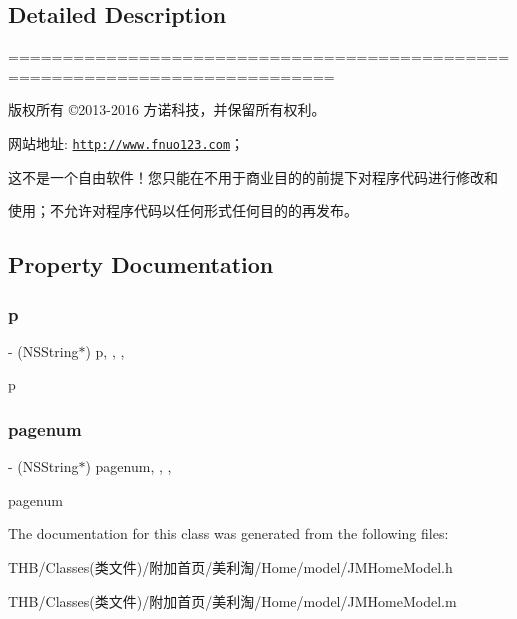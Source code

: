 \subsection{Detailed Description}
============================================================================

版权所有 ©2013-\/2016 方诺科技，并保留所有权利。

网站地址\+: \href{http://www.fnuo123.com}{\tt http\+://www.\+fnuo123.\+com}； 



这不是一个自由软件！您只能在不用于商业目的的前提下对程序代码进行修改和

使用；不允许对程序代码以任何形式任何目的的再发布。 

 

\subsection{Property Documentation}
\mbox{\label{interface_j_m_home_model_aaae2bcc132f99e39ab5ba76fc3125968}} 
\subsubsection{\texorpdfstring{p}{p}}
{\footnotesize\ttfamily -\/ (N\+S\+String$\ast$) p\hspace{0.3cm}{\ttfamily [read]}, {\ttfamily [write]}, {\ttfamily [nonatomic]}, {\ttfamily [copy]}}

p \mbox{\label{interface_j_m_home_model_a04a1d641585dea8183d3591b5eec7765}} 
\subsubsection{\texorpdfstring{pagenum}{pagenum}}
{\footnotesize\ttfamily -\/ (N\+S\+String$\ast$) pagenum\hspace{0.3cm}{\ttfamily [read]}, {\ttfamily [write]}, {\ttfamily [nonatomic]}, {\ttfamily [copy]}}

pagenum 

The documentation for this class was generated from the following files\+:\begin{DoxyCompactItemize}
\item 
T\+H\+B/\+Classes(类文件)/附加首页/美利淘/\+Home/model/J\+M\+Home\+Model.\+h\item 
T\+H\+B/\+Classes(类文件)/附加首页/美利淘/\+Home/model/J\+M\+Home\+Model.\+m\end{DoxyCompactItemize}
